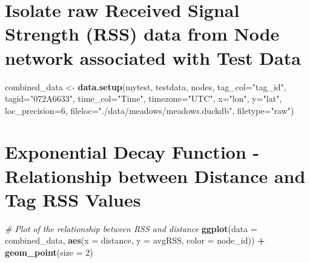 \documentclass[
]{book}
\newenvironment{Shaded}{\begin{snugshade}}{\end{snugshade}}
\newcommand{\AttributeTok}[1]{\textcolor[rgb]{0.13,0.29,0.53}{#1}}
\newcommand{\CommentTok}[1]{\textcolor[rgb]{0.56,0.35,0.01}{\textit{#1}}}
\newcommand{\DecValTok}[1]{\textcolor[rgb]{0.00,0.00,0.81}{#1}}
\newcommand{\FunctionTok}[1]{\textcolor[rgb]{0.13,0.29,0.53}{\textbf{#1}}}
\newcommand{\NormalTok}[1]{#1}
\newcommand{\OtherTok}[1]{\textcolor[rgb]{0.56,0.35,0.01}{#1}}
\newcommand{\SpecialCharTok}[1]{\textcolor[rgb]{0.81,0.36,0.00}{\textbf{#1}}}
\newcommand{\StringTok}[1]{\textcolor[rgb]{0.31,0.60,0.02}{#1}}
\begin{document}
\section{Isolate raw Received Signal Strength (RSS) data from Node network associated with Test Data}\label{isolate-raw-received-signal-strength-rss-data-from-node-network-associated-with-test-data}

\begin{Shaded}
\begin{Highlighting}[]
\NormalTok{combined\_data }\OtherTok{\textless{}{-}} \FunctionTok{data.setup}\NormalTok{(mytest, }
\NormalTok{                            testdata, }
\NormalTok{                            nodes, }
                            \AttributeTok{tag\_col=}\StringTok{"tag\_id"}\NormalTok{, }
                            \AttributeTok{tagid=}\StringTok{"072A6633"}\NormalTok{, }
                            \AttributeTok{time\_col=}\StringTok{"Time"}\NormalTok{,}
                            \AttributeTok{timezone=}\StringTok{"UTC"}\NormalTok{,}
                            \AttributeTok{x=}\StringTok{"lon"}\NormalTok{,}
                            \AttributeTok{y=}\StringTok{"lat"}\NormalTok{, }
                            \AttributeTok{loc\_precision=}\DecValTok{6}\NormalTok{, }
                            \AttributeTok{fileloc=}\StringTok{"./data/meadows/meadows.duckdb"}\NormalTok{, }
                            \AttributeTok{filetype=}\StringTok{"raw"}\NormalTok{)}
\end{Highlighting}
\end{Shaded}

\section{Exponential Decay Function - Relationship between Distance and Tag RSS Values}\label{exponential-decay-function---relationship-between-distance-and-tag-rss-values}

\begin{Shaded}
\begin{Highlighting}[]
\CommentTok{\# Plot of the relationship between RSS and distance}
\FunctionTok{ggplot}\NormalTok{(}\AttributeTok{data =}\NormalTok{ combined\_data, }
       \FunctionTok{aes}\NormalTok{(}\AttributeTok{x =}\NormalTok{ distance, }
           \AttributeTok{y =}\NormalTok{ avgRSS, }
           \AttributeTok{color =}\NormalTok{ node\_id)) }\SpecialCharTok{+}
  \FunctionTok{geom\_point}\NormalTok{(}\AttributeTok{size =} \DecValTok{2}\NormalTok{)}
\end{Highlighting}
\end{Shaded}
\end{document}
